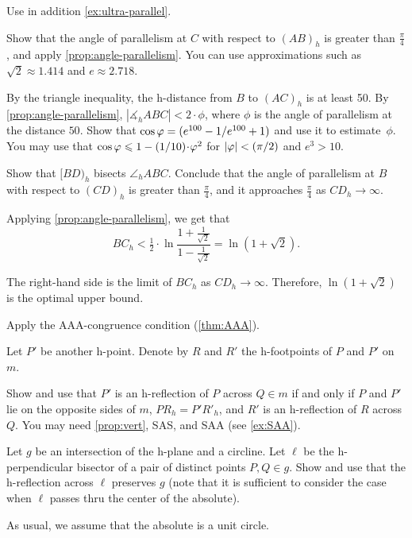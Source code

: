  Use in addition \ref{ex:ultra-parallel}.

 Show that the angle of parallelism at $C$ with respect to $(AB)_h$ is greater than $\tfrac\pi4$, and apply \ref{prop:angle-parallelism}.
You can use approximations such as $\sqrt2\approx 1.414$ and $e\approx2.718$.


By the triangle inequality, the h-distance from $B$ to $(AC)_h$ is at least 50.
By \ref{prop:angle-parallelism}, $|\measuredangle_h ABC|<2\cdot\phi$, where $\phi$ is the angle of parallelism at the distance $50$.
Show that $\cos\phi\z=\tfrac{e^{100}-1}{e^{100}+1}$ and
use it to estimate~$\phi$.
You may use that $\cos\phi\z\le 1-\tfrac1{10}\cdot\phi^2$ for $|\phi|\z<\tfrac\pi2$ and $e^3>10$.

Show that $[BD)_h$ bisects $\angle_h ABC$.
Conclude that the angle of parallelism at $B$ with respect to $(CD)_h$ is greater than $\tfrac\pi4$,
and it approaches $\tfrac\pi4$ as $CD_h\to\infty$.

Applying \ref{prop:angle-parallelism},
we get that
$$BC_h<\tfrac12\cdot\ln\frac{1+\frac1{\sqrt{2}}}{1-\frac1{\sqrt{2}}}=\ln\left(1+\sqrt{2}\right).$$

The right-hand side is the limit of $BC_h$ as $CD_h\to\infty$.
Therefore, $\ln\left(1+\sqrt{2}\right)$ is the optimal upper bound.

Apply the AAA-congruence condition (\ref{thm:AAA}).

Let $P'$ be another h-point.
Denote by $R$ and $R'$ the h-footpoints of $P$ and $P'$ on $m$.

Show and use that $P'$ is an h-reflection of $P$ across $Q\in m$ if and only if $P$ and $P'$ lie on the opposite sides of $m$, $PR_h=P'R'_h$, and $R'$ is an h-reflection of $R$ across $Q$.
You may need \ref{prop:vert}, SAS, and SAA (see \ref{ex:SAA}).

Let $g$ be an intersection of the h-plane and a circline.
Let $\ell$ be the h-perpendicular bisector of a pair of distinct points $P,Q\in g$.
Show and use that the h-reflection across $\ell$ preserves $g$
(note that it is sufficient to consider the case when $\ell$ passes thru the center of the absolute).

As usual, we assume that the absolute is a unit circle. 

